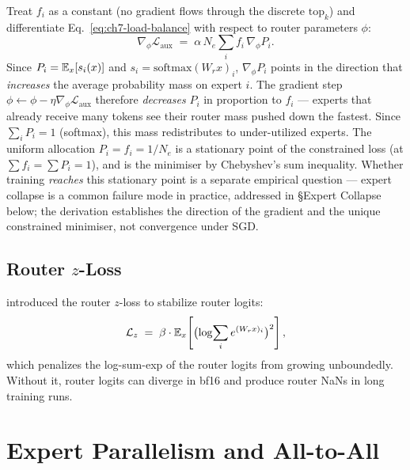 \begin{derivation}
Treat $f_i$ as a constant (no gradient flows through the discrete
$\mathrm{top}_k$) and differentiate
Eq.~\eqref{eq:ch7-load-balance} with respect to router parameters
$\phi$:
\[
\nabla_\phi \mathcal{L}_{\mathrm{aux}}
  \;=\; \alpha\,N_e \sum_{i} f_i \,\nabla_\phi P_i.
\]
Since $P_i = \mathbb{E}_x[s_i(x)]$ and $s_i = \mathrm{softmax}(W_r x)_i$,
$\nabla_\phi P_i$ points in the direction that \emph{increases} the
average probability mass on expert $i$. The gradient step
$\phi \gets \phi - \eta \nabla_\phi \mathcal{L}_{\mathrm{aux}}$
therefore \emph{decreases} $P_i$ in proportion to $f_i$ --- experts
that already receive many tokens see their router mass pushed down
the fastest. Since $\sum_i P_i = 1$ (softmax), this mass
redistributes to under-utilized experts. The uniform allocation
$P_i = f_i = 1/N_e$ is a stationary point of the constrained loss
(at $\sum f_i = \sum P_i = 1$), and is the minimiser by Chebyshev's
sum inequality. Whether training \emph{reaches} this stationary
point is a separate empirical question --- expert collapse is a
common failure mode in practice, addressed in
\S Expert Collapse below; the derivation establishes the direction
of the gradient and the unique constrained minimiser, not
convergence under SGD.
\end{derivation}

\subsection{\texorpdfstring{Router $z$-Loss}{Router z-Loss}}

\citet{zoph2022stmoe} introduced the router $z$-loss to stabilize
router logits:
\begin{equation}
\label{eq:ch7-zloss}
\mathcal{L}_z \;=\;
  \beta \cdot \mathbb{E}_x\!\left[\bigl(\log\!\sum_i e^{(W_r x)_i}\bigr)^2\right],
\end{equation}
which penalizes the log-sum-exp of the router logits from growing
unboundedly. Without it, router logits can diverge in bf16 and
produce router NaNs in long training runs.

\section{Expert Parallelism and All-to-All}

